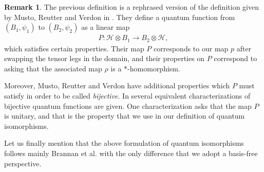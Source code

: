\documentclass{amsart}
\theoremstyle{definition}
\newtheorem{remark}[thm]{Remark}
\theoremstyle{definition}
\begin{document}
\begin{remark}
    The previous definition is a rephrased version of the definition given by Musto, Reutter and Verdon in \cite{musto_compositional_2018}. They define a quantum function from $(B_1, \psi_1)$ to $(B_2, \psi_2)$ as a linear map
    \begin{align*}
        P: \mathcal{H} \otimes B_1 \to B_2 \otimes \mathcal{H},
    \end{align*}
    which satisfies certain properties. Their map $P$ corresponds to our map $p$ after swapping the tensor legs in the domain, and their properties on $P$ correspond to asking that the associated map $\rho$ is a $\ast$-homomorphism.

    Moreover, Musto, Reutter and Verdon have additional properties which $P$ must satisfy in order to be called \emph{bijective}. In \cite[Theorem 4.8]{musto_compositional_2018} several equivalent characterizations of bijective quantum functions are given. One characterization asks that the map $P$ is unitary, and that is the property that we use in our definition of quantum isomorphisms.

    Let us finally mention that the above formulation of quantum isomorphisms follows mainly Brannan et al. \cite{brannan_bigalois_2020} with the only difference that we adopt a basis-free perspective.
\end{remark}
\end{document}
